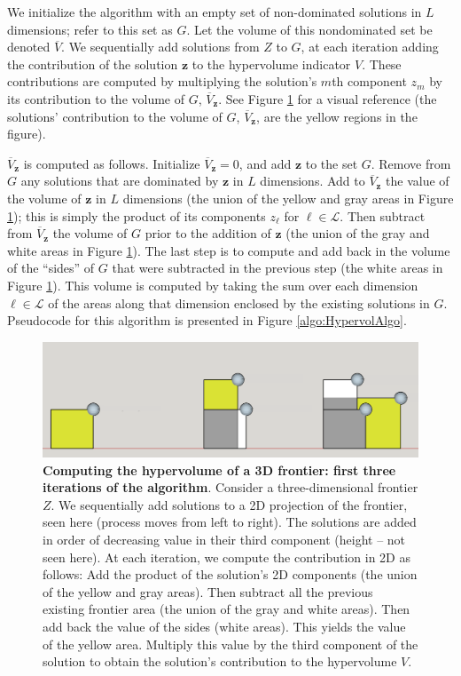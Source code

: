 We initialize the algorithm with an empty set of non-dominated solutions in $L$ dimensions; refer to this set as $G$. Let the volume of this nondominated set be denoted $\overbar{V}$. We sequentially add solutions from $Z$ to $G$, at each iteration adding the contribution of the solution $\mathbf{z}$ to the hypervolume indicator $V$. These contributions are computed by multiplying the solution's $m$th component $z_m$ by its contribution to the volume of $G$, $\overbar{V}_\mathbf{z}$. See Figure \ref{fig:AlgoAid} for a visual reference (the solutions' contribution to the volume of $G$, $\overbar{V}_\mathbf{z}$, are the yellow regions in the figure).

$\overbar{V}_\mathbf{z}$ is computed as follows. Initialize $\overbar{V}_\mathbf{z} = 0$, and add $\mathbf{z}$ to the set $G$. Remove from $G$ any solutions that are dominated by $\mathbf{z}$ in $L$ dimensions. Add to $\overbar{V}_\mathbf{z}$ the value of the volume of $\mathbf{z}$ in $L$ dimensions (the union of the yellow and gray areas in Figure \ref{fig:AlgoAid}); this is simply the product of its components $z_\ell$ for $\ell \in \mathcal{L}$. Then subtract from $\overbar{V}_\mathbf{z}$ the volume of $G$ prior to the addition of $\mathbf{z}$ (the union of the gray and white areas in Figure \ref{fig:AlgoAid}). The last step is to compute and add back in the volume of the ``sides'' of $G$ that were subtracted in the previous step (the white areas in Figure \ref{fig:AlgoAid}). This volume is computed by taking the sum over each dimension $\ell \in \mathcal{L}$ of the areas along that dimension enclosed by the existing solutions in $G$. Pseudocode for this algorithm is presented in Figure \ref{algo:HypervolAlgo}.

\begin{figure}[ht]
\centering
\caption[First iterations for computing $\overbar{V}$]{\textbf{Computing the hypervolume of a 3D frontier: first three iterations of the algorithm}. Consider a three-dimensional frontier $Z$. We sequentially add solutions to a 2D projection of the frontier, seen here (process moves from left to right). The solutions are added in order of decreasing value in their third component (height -- not seen here). At each iteration, we compute the contribution in 2D as follows: Add the product of the solution's 2D components (the union of the yellow and gray areas). Then subtract all the previous existing frontier area (the union of the gray and white areas). Then add back the value of the sides (white areas). This yields the value of the yellow area. Multiply this value by the third component of the solution to obtain the solution's contribution to the hypervolume $V$.}
\label{fig:AlgoAid}
\includegraphics[width=.85\textwidth]{../images/3DFrontierSchematic_SketchUp_FirstSteps_2D_clean}
\end{figure}

